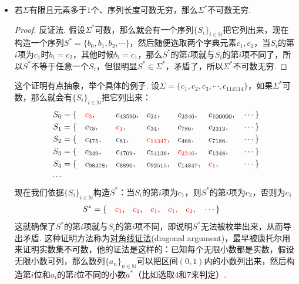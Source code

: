 \begin{itemize}
    \item 若\(\Sigma\)有限且元素多于\(1\)个、序列长度可数无穷，那么\(\Sigma^*\)不可数无穷.
    \begin{proof}
        反证法. 假设\(\Sigma^*\)可数，那么就会有一个序列\(\{S_i\}_{i \in \mathbb{N}}\)把它列出来，现在构造一个序列\(S^*=\{b_0, b_1, b_2, \cdots\}\)，然后随便选取两个字典元素\(c_1, c_2\)，当\(S_i\)的第\(i\)项为\(c_1\)时\(b_i=c_2\)，其他时候\(b_i=c_1\)，那么\(S^*\)的第\(i\)项就与\(S_i\)的第\(i\)项不同了，所以\(S^*\)不等于任意一个\(S_i\)，但很明显\(S^* \in \Sigma^*\)，矛盾了，所以\(\Sigma^*\)不可数无穷. 
    \end{proof}
    \begin{note}
        这个证明有点抽象，举个具体的例子. 设\(\Sigma = \{c_1, c_2, c_3, \cdots, c_{114514}\}\)，如果\(\Sigma^*\)可数，那么就会有\(\{S_i\}_{i \in \mathbb{N}}\)把它列出来：
        \begin{align*}
            S_0 &= \{&&{\color{red}c_3}, &&c_{43590}, &&c_{24}, &&c_{2346}, &&c_{100000}, &&\cdots\} \\
            S_1 &= \{&&c_{78}, &&{\color{red}c_1}, &&c_{34}, &&c_{786}, &&c_{2313}, &&\cdots\} \\
            S_2 &= \{&&c_{475}, &&c_{81}, &&{\color{red}c_{14347}}, &&c_{468}, &&c_{7186}, &&\cdots\} \\
            S_3 &= \{&&c_{349}, &&c_{4709}, &&c_{54136}, &&{\color{red}c_{2346}}, &&c_{1348}, &&\cdots\} \\
            S_4 &= \{&&c_{98478}, &&c_{8890}, &&c_{92515}, &&c_{14847}, &&{\color{red}c_1}, &&\cdots\} \\
            \cdots \\
        \end{align*}
        现在我们依据\(\{S_i\}_{i \in \mathbb{N}}\)构造\(S^*\)：当\(S_i\)的第\(i\)项为\(c_1\)，则\(S^*\)的第\(i\)项为\(c_2\)，否则为\(c_1\)
        \begin{align*}
            S^* &= \{&&{\color{red}c_1}, &&{\color{red}c_2}, &&{\color{red}c_1}, &&{\color{red}c_1,} &&{\color{red}c_2}, &&\cdots\}
        \end{align*}
        这就确保了\(S^*\)的第\(i\)项就与\(S_i\)的第\(i\)项不同，即说明\(S^*\)无法被枚举出来，从而导出矛盾. 这种证明方法称为\underline{对角线证法}(diagonal argument)，最早被康托尔用来证明实数集不可数，他的证法是这样的：已知每个无限小数都是实数，假设无限小数可列，那么数列\(\{a_n\}_{n \in \mathbb{N}}\)可以把区间\((0,1)\)内的小数列出来，然后构造第\(i\)位和\(a_i\)的第\(i\)位不同的小数\(a^*\)（比如选取\(4\)和\(7\)来判定）.

\end{note}
\end{itemize}
